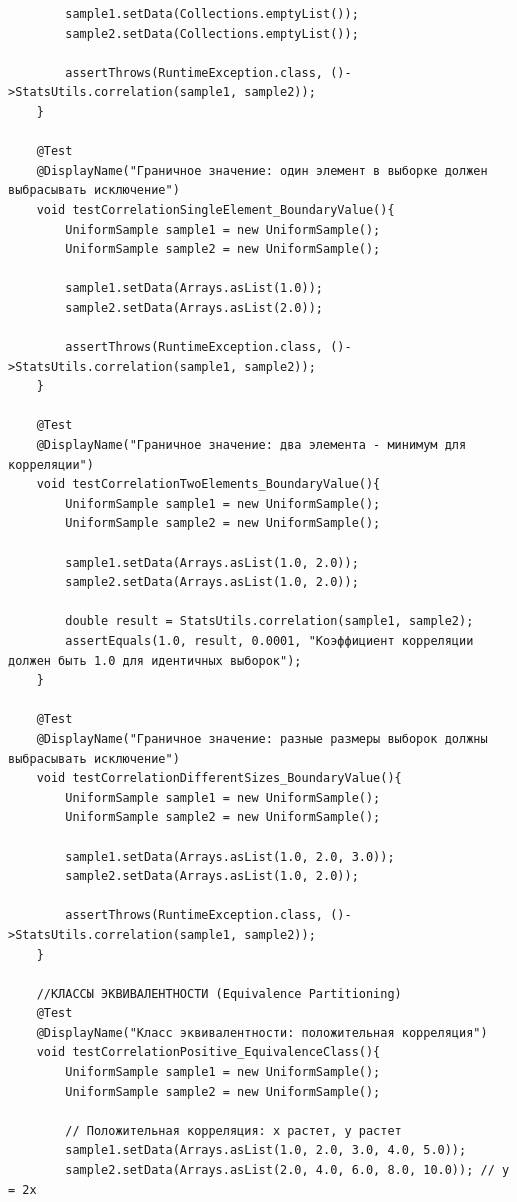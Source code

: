 \begin{verbatim}
        sample1.setData(Collections.emptyList());
        sample2.setData(Collections.emptyList());

        assertThrows(RuntimeException.class, ()->StatsUtils.correlation(sample1, sample2));
    }

    @Test
    @DisplayName("Граничное значение: один элемент в выборке должен выбрасывать исключение")
    void testCorrelationSingleElement_BoundaryValue(){
        UniformSample sample1 = new UniformSample();
        UniformSample sample2 = new UniformSample();

        sample1.setData(Arrays.asList(1.0));
        sample2.setData(Arrays.asList(2.0));

        assertThrows(RuntimeException.class, ()->StatsUtils.correlation(sample1, sample2));
    }

    @Test
    @DisplayName("Граничное значение: два элемента - минимум для корреляции")
    void testCorrelationTwoElements_BoundaryValue(){
        UniformSample sample1 = new UniformSample();
        UniformSample sample2 = new UniformSample();

        sample1.setData(Arrays.asList(1.0, 2.0));
        sample2.setData(Arrays.asList(1.0, 2.0));

        double result = StatsUtils.correlation(sample1, sample2);
        assertEquals(1.0, result, 0.0001, "Коэффициент корреляции должен быть 1.0 для идентичных выборок");
    }

    @Test
    @DisplayName("Граничное значение: разные размеры выборок должны выбрасывать исключение")
    void testCorrelationDifferentSizes_BoundaryValue(){
        UniformSample sample1 = new UniformSample();
        UniformSample sample2 = new UniformSample();

        sample1.setData(Arrays.asList(1.0, 2.0, 3.0));
        sample2.setData(Arrays.asList(1.0, 2.0));

        assertThrows(RuntimeException.class, ()->StatsUtils.correlation(sample1, sample2));
    }

    //КЛАССЫ ЭКВИВАЛЕНТНОСТИ (Equivalence Partitioning)
    @Test
    @DisplayName("Класс эквивалентности: положительная корреляция")
    void testCorrelationPositive_EquivalenceClass(){
        UniformSample sample1 = new UniformSample();
        UniformSample sample2 = new UniformSample();

        // Положительная корреляция: x растет, y растет
        sample1.setData(Arrays.asList(1.0, 2.0, 3.0, 4.0, 5.0));
        sample2.setData(Arrays.asList(2.0, 4.0, 6.0, 8.0, 10.0)); // y = 2x


\end{verbatim}
